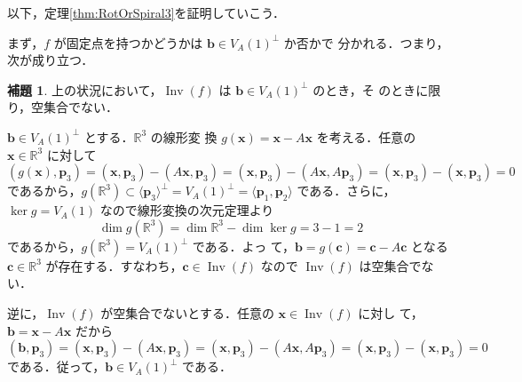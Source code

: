 \documentclass[11pt, uplatex, dvipdfmx, titlepage]{jsarticle}
\makeatletter
\DeclareMathOperator{\Inv}{Inv}
\renewenvironment{proof}[1][\proofname]{\par
  \pushQED{\qed}%
  \normalfont \topsep6\p@\@plus6\p@\relax
  \trivlist
  \item[\hskip\labelsep
         \bfseries
    {#1}]\ignorespaces
}{%
  \popQED\endtrivlist\@endpefalse
}
\theoremstyle{definition}
\newtheorem{lemma}{補題}[section]
\renewcommand{\proofname}{\textbf{証明}}
\makeatother
\begin{document}
以下，定理\ref{thm:RotOrSpiral3}を証明していこう．

まず，$f$ が固定点を持つかどうかは $\bm{b} \in V_A(1)^{\perp}$ か否かで
分かれる．つまり，次が成り立つ．

\begin{lemma}\label{lem:RotOrSpiral3}
  上の状況において，$\Inv(f)$ は $\bm{b} \in V_A(1)^{\perp}$ のとき，そ
  のときに限り，空集合でない．
\end{lemma}

\begin{proof}
  $\bm{b} \in V_A(1)^{\perp}$ とする．$\mathbb{R}^3$ の線形変
  換 $g(\bm{x}) = \bm{x}-A\bm{x}$ を考える．任意の $\bm{x} \in
  \mathbb{R}^3$ に対して
  \[
    (g(\bm{x}), \bm{p}_3) = (\bm{x}, \bm{p}_3) - (A\bm{x}, \bm{p}_3) =
    (\bm{x}, \bm{p}_3) -(A\bm{x},A\bm{p}_3) =(\bm{x}, \bm{p}_3) -
    (\bm{x},\bm{p}_3) = 0
  \]
  であるから，$g(\mathbb{R}^3) \subset \langle \bm{p}_3
  \rangle^{\perp}=V_A(1)^{\perp}=\langle \bm{p}_1, \bm{p}_2\rangle$
  である．さらに，$\ker g = V_A(1)$ なので線形変換の次元定理より
  \[
    \dim g(\mathbb{R}^3) = \dim \mathbb{R}^3 - \dim \ker g = 3 -1 =2
  \]
  であるから，$g(\mathbb{R}^3) = V_A(1)^{\perp}$ である．よっ
  て，$\bm{b} = g(\bm{c}) = \bm{c} - A\bm{c}$ となる
  $\bm{c} \in \mathbb{R}^3$ が存在する．すなわち，$\bm{c} \in \Inv(f)$
  なので $\Inv(f)$ は空集合でない．

  逆に，$\Inv(f)$ が空集合でないとする．任意の $\bm{x} \in \Inv(f)$ に対し
  て， $\bm{b} = \bm{x} - A\bm{x}$ だから
  \[
    (\bm{b}, \bm{p}_3) = (\bm{x},\bm{p}_3) - (A\bm{x}, \bm{p}_3)
    =(\bm{x}, \bm{p}_3) - (A\bm{x}, A\bm{p}_3)
    =(\bm{x}, \bm{p}_3) - (\bm{x}, \bm{p}_3) = 0
  \]
  である．従って，$\bm{b} \in V_A(1)^{\perp}$ である．
\end{proof}
\end{document}

